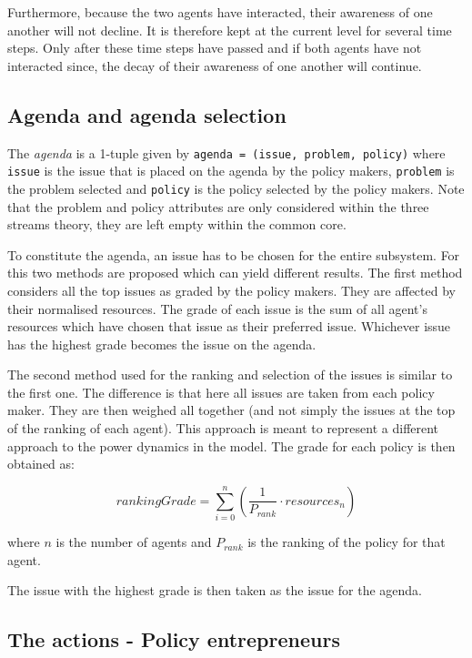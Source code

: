 Furthermore, because the two agents have interacted, their awareness of one another will not decline. It is therefore kept at the current level for several time steps. Only after these time steps have passed and if both agents have not interacted since, the decay of their awareness of one another will continue.

\subsection{Agenda and agenda selection}

The \emph{agenda} is a 1-tuple given by \texttt{agenda = (issue, problem, policy)} where \texttt{issue} is the issue that is placed on the agenda by the policy makers, \texttt{problem} is the problem selected and \texttt{policy} is the policy selected by the policy makers. Note that the problem and policy attributes are only considered within the three streams theory, they are left empty within the common core.


To constitute the agenda, an issue has to be chosen for the entire subsystem. For this two methods are proposed which can yield different results. The first method considers all the top issues as graded by the policy makers. They are affected by their normalised resources. The grade of each issue is the sum of all agent's resources which have chosen that issue as their preferred issue. Whichever issue has the highest grade becomes the issue on the agenda.

The second method used for the ranking and selection of the issues is similar to the first one. The difference is that here all issues are taken from each policy maker. They are then weighed all together (and not simply the issues at the top of the ranking of each agent). This approach is meant to represent a different approach to the power dynamics in the model. The grade for each policy is then obtained as:

\begin{equation}
rankingGrade = \sum_{i=0}^n \left( \frac{1}{P_{rank}} \cdot resources_n \right)
\end{equation}

where $n$ is the number of agents and $P_{rank}$ is the ranking of the policy for that agent.

The issue with the highest grade is then taken as the issue for the agenda.

\subsection{The actions - Policy entrepreneurs}


